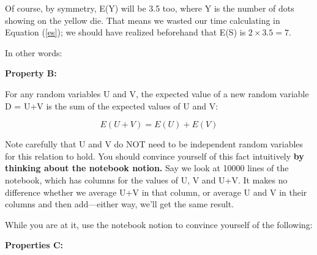 Of course, by symmetry, E(Y) will be 3.5 too, where Y is the number of
dots showing on the yellow die.  That means we wasted our time
calculating in Equation (\ref{es}); we should have realized beforehand
that E(S) is $2 \times 3.5 = 7$. 

In other words: 

{\bf Property B:} 

For any random variables U and V, the expected value of a new random
variable D = U+V is the sum of the expected values of U and V:

\begin{equation}
\label{eofsum} 
E(U+V) = E(U) + E(V)
\end{equation}

Note carefully that U and V do NOT need to be independent random
variables for this relation to hold.  You should convince yourself of
this fact intuitively {\bf by thinking about the notebook notion.}
Say we look at 10000 lines of the notebook, which has columns for the
values of U, V and U+V.  It makes no difference whether we average U+V
in that column, or average U and V in their columns and then
add---either way, we'll get the same result.

While you are at it, use the notebook notion to convince yourself of the
following:

{\bf Properties C:}  

